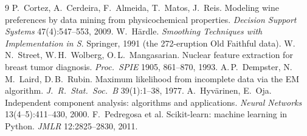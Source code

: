 \documentclass[10pt,a4paper]{article}
\begin{document}
\vspace{6pt}
\par
\vspace{-2pt}
{\renewcommand{\section}[2]{}%
\footnotesize
\begin{thebibliography}{9}
\setlength{\itemsep}{0pt}\setlength{\parskip}{0pt}
 P.~Cortez, A.~Cerdeira, F.~Almeida, T.~Matos, J.~Reis.
  Modeling wine preferences by data mining from physicochemical properties.
  \emph{Decision Support Systems} 47(4):547--553, 2009.
 W.~Härdle. \emph{Smoothing Techniques with Implementation
  in S}. Springer, 1991 (the 272-eruption Old Faithful data).
 W.\,N.~Street, W.\,H.~Wolberg, O.\,L.~Mangasarian. Nuclear
  feature extraction for breast tumor diagnosis. \emph{Proc.\ SPIE} 1905,
  861--870, 1993.
 A.\,P.~Dempster, N.\,M.~Laird, D.\,B.~Rubin. Maximum
  likelihood from incomplete data via the EM algorithm. \emph{J.\ R.\ Stat.\
  Soc.\ B} 39(1):1--38, 1977.
 A.~Hyvärinen, E.~Oja. Independent component analysis:
  algorithms and applications. \emph{Neural Networks} 13(4--5):411--430,
  2000.
 F.~Pedregosa et al. Scikit-learn: machine learning in
  Python. \emph{JMLR} 12:2825--2830, 2011.
\end{thebibliography}}
\end{document}
